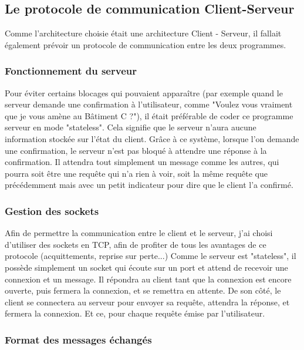 \documentclass{report}
\begin{document}
    \subsection{Le protocole de communication Client-Serveur}

    {Comme l'architecture choisie était une architecture Client - Serveur, il
    fallait également prévoir un protocole de communication entre les deux programmes.}

      \subsubsection{Fonctionnement du serveur}
        {Pour éviter certains blocages qui pouvaient apparaître (par exemple quand
        le serveur demande une confirmation à l'utilisateur, comme "Voulez vous
        vraiment que je vous amène au Bâtiment C ?"), il était préférable de coder
        ce programme serveur en mode "stateless". Cela signifie que le serveur
        n'aura aucune information stockée sur l'état du client. Grâce à ce système,
        lorsque l'on demande une confirmation, le serveur n'est pas bloqué à attendre
        une réponse à la confirmation. Il attendra tout simplement un message comme
        les autres, qui pourra soit être une requête qui n'a rien à voir, soit la
        même requête que précédemment mais avec un petit indicateur pour dire que
        le client l'a confirmé.}

      \subsubsection{Gestion des sockets}
        {Afin de permettre la communication entre le client et le serveur, j'ai choisi
        d'utiliser des sockets en TCP, afin de profiter de tous les avantages de ce
        protocole (acquittements, reprise sur perte...)\newline}
        {Comme le serveur est "stateless", il possède simplement un socket qui
        écoute sur un port et attend de recevoir une connexion et un message.
        Il répondra au client tant que la connexion est encore ouverte, puis
        fermera la connexion, et se remettra en attente.\newline}
        {De son côté, le client se connectera au serveur pour envoyer sa requête,
        attendra la réponse, et fermera la connexion. Et ce, pour chaque requête
        émise par l'utilisateur.}

      \subsubsection{Format des messages échangés}
\end{document}
